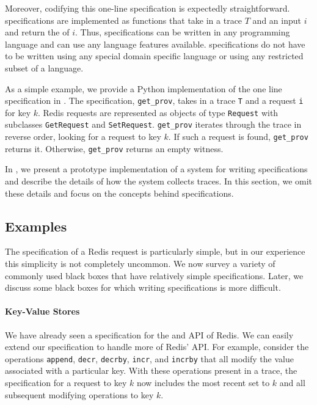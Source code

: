 Moreover, codifying this one-line \watprovenance{} specification is expectedly
straightforward. \Watprovenance{} specifications are implemented as functions
that take in a trace $T$ and an input $i$ and return the \watprovenance{} of
$i$. Thus, \watprovenance{} specifications can be written in any programming
language and can use any language features available.  \Watprovenance{}
specifications do not have to be written using any special domain specific
language or using any restricted subset of a language.

As a simple example, we provide a Python implementation of the one line
\watprovenance{} specification in .  The specification,
\texttt{get\_prov}, takes in a trace \texttt{T} and a \kvget{} request
\texttt{i} for key $k$. Redis requests are represented as objects of type
\texttt{Request} with subclasses \texttt{GetRequest} and \texttt{SetRequest}.
\texttt{get\_prov} iterates through the trace in reverse order, looking for a
\kvset{} request to key $k$. If such a \kvset{} request is found,
\texttt{get\_prov} returns it. Otherwise, \texttt{get\_prov} returns an empty
witness.

{}

In , we present a prototype implementation of a system for
writing \watprovenance{} specifications and describe the details of how the
system collects traces. In this section, we omit these details and focus on
the concepts behind \watprovenance{} specifications.

\subsection{Examples}
The \watprovenance{} specification of a Redis \kvget{} request is particularly
simple, but in our experience this simplicity is not completely uncommon. We
now survey a variety of commonly used black boxes that have relatively simple
\watprovenance{} specifications. Later, we discuss some black boxes for which
writing \watprovenance{} specifications is more difficult.

\paragraph{Key-Value Stores}
We have already seen a \watprovenance{} specification for the \kvget{} and
\kvset{} API of Redis. We can easily extend our \watprovenance{} specification
to handle more of Redis' API. For example, consider the operations
\texttt{append}, \texttt{decr}, \texttt{decrby}, \texttt{incr}, and
\texttt{incrby} that all modify the value associated with a particular key.
With these operations present in a trace, the \watprovenance{} specification
for a \kvget{} request to key $k$ now includes the most recent set to $k$ and
all subsequent modifying operations to key $k$.

